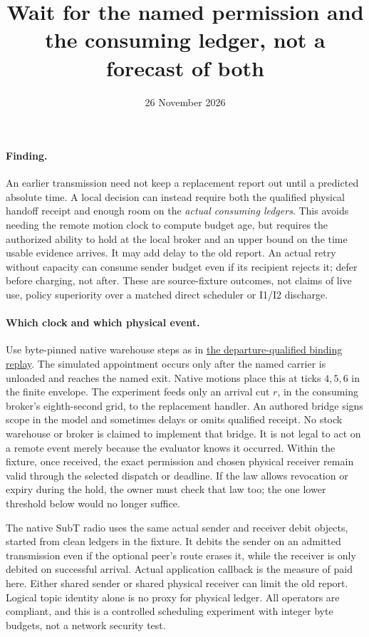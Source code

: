 \documentclass{article}
\title{Wait for the named permission and the consuming ledger, not a forecast of both}
\date{26 November 2026}
\begin{document}
\maketitle
\paragraph{Finding.}
An earlier transmission need not keep a replacement report out until
a predicted absolute time. A local decision can instead require both
the qualified physical handoff receipt and enough room on the
\emph{actual consuming ledgers}. This avoids needing the remote motion
clock to compute budget age, but requires the authorized ability to
hold at the local broker and an upper bound on the time usable evidence
arrives. It may add delay to the old report. An actual retry without
capacity can consume sender budget even if its recipient rejects it;
defer before charging, not after. These are source-fixture outcomes,
not claims of live use, policy superiority over a matched direct
scheduler or I1/I2 discharge.

\paragraph{Which clock and which physical event.}
Use byte-pinned native warehouse steps as in
\href{https://github.com/eternal-november/eos-research-programmes/pull/625}{the
departure-qualified binding replay}. The simulated appointment occurs only
after the named carrier is unloaded and reaches the named exit.
Native motions place this at ticks \(4,5,6\) in the finite envelope.
The experiment feeds only an arrival cut \(r\), in the consuming
broker's eighth-second grid, to the replacement handler.
An authored bridge signs scope in the model and sometimes delays or
omits qualified receipt. No stock warehouse or broker is claimed to
implement that bridge. It is not legal to act on a remote event merely
because the evaluator knows it occurred. Within the fixture, once
received, the exact permission and chosen physical receiver remain valid
through the selected dispatch or deadline. If the law allows revocation
or expiry during the hold, the owner must check that law too; the one
lower threshold below would no longer suffice.

The native SubT radio uses the same actual sender and receiver debit
objects, started from clean ledgers in the fixture. It debits the
sender on an admitted transmission even if the optional peer's route
erases it, while the receiver is only debited on successful arrival.
Actual application callback is the measure of paid here.
Either shared sender or shared physical receiver can limit the old
report. Logical topic identity alone is no proxy for physical ledger.
All operators are compliant, and this is a controlled scheduling
experiment with integer byte budgets, not a network security test.
\end{document}
